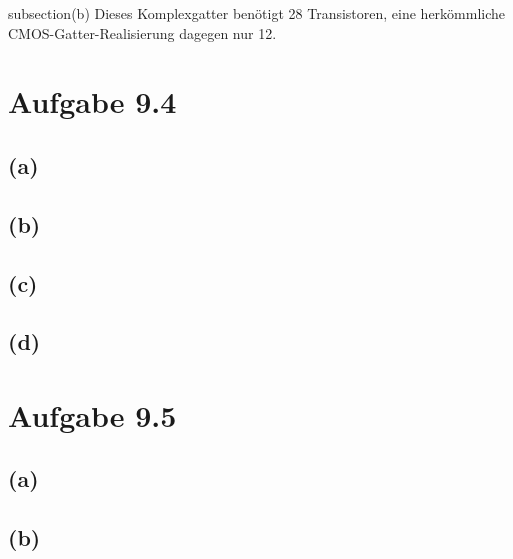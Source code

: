\documentclass[12pt]{article}
\begin{document}
subsection{(b)}
Dieses Komplexgatter benötigt 28 Transistoren, eine herkömmliche CMOS-Gatter-Realisierung dagegen nur 12.


\section{Aufgabe 9.4}
\subsection{(a)}
\subsection{(b)}
\subsection{(c)}
\subsection{(d)}

\section{Aufgabe 9.5}
\subsection{(a)}
\subsection{(b)}
\end{document}
